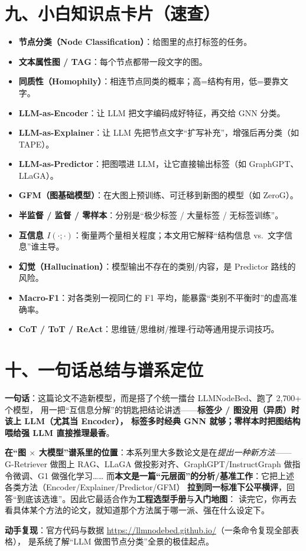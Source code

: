 \documentclass[11pt,UTF8,fontset=fandol]{ctexart}
\begin{document}
\section{九、小白知识点卡片（速查）}
\begin{itemize}[leftmargin=2em]
  \item \textbf{节点分类（Node Classification）}：给图里的点打标签的任务。
  \item \textbf{文本属性图 / TAG}：每个节点都带一段文字的图。
  \item \textbf{同质性（Homophily）}：相连节点同类的概率；高=结构有用，低=要靠文字。
  \item \textbf{LLM-as-Encoder}：让 LLM 把文字编码成好特征，再交给 GNN 分类。
  \item \textbf{LLM-as-Explainer}：让 LLM 先把节点文字“扩写补充”，增强后再分类（如 TAPE）。
  \item \textbf{LLM-as-Predictor}：把图喂进 LLM，让它直接输出标签（如 GraphGPT、LLaGA）。
  \item \textbf{GFM（图基础模型）}：在大图上预训练、可迁移到新图的模型（如 ZeroG）。
  \item \textbf{半监督 / 监督 / 零样本}：分别是“极少标签 / 大量标签 / 无标签训练”。
  \item \textbf{互信息 $I(\cdot;\cdot)$}：衡量两个量相关程度；本文用它解释“结构信息 vs.\ 文字信息”谁主导。
  \item \textbf{幻觉（Hallucination）}：模型输出不存在的类别/内容，是 Predictor 路线的风险。
  \item \textbf{Macro-F1}：对各类别一视同仁的 F1 平均，能暴露“类别不平衡时”的虚高准确率。
  \item \textbf{CoT / ToT / ReAct}：思维链/思维树/推理-行动等通用提示词技巧。
\end{itemize}

\section{十、一句话总结与谱系定位}

\textbf{一句话}：这篇论文不造新模型，而是搭了个统一擂台 LLMNodeBed、跑了 2{,}700+ 个模型，
用一把“互信息分解”的钥匙把结论讲透——\textbf{标签少 / 图没用（异质）时该上 LLM（尤其当 Encoder），
标签多时经典 GNN 就够；零样本时把图结构喂给强 LLM 直接推理最香}。

\textbf{在“图 $\times$ 大模型”谱系里的位置}：本系列里大多数论文是在\emph{提出一种新方法}——
G-Retriever 做图上 RAG、LLaGA 做投影对齐、GraphGPT/InstructGraph 做指令微调、G1 做强化学习……
而\textbf{本文是一篇“元层面”的分析/基准工作}：它把上述各类方法（Encoder/Explainer/Predictor/GFM）
\textbf{拉到同一标准下公平横评}，回答“到底该选谁”。因此它最适合作为\textbf{工程选型手册}与\textbf{入门地图}：
读完它，你再去看具体某个方法的论文，就知道那个方法属于哪一派、强在什么设定下。

\textbf{动手复现}：官方代码与数据 \url{https://llmnodebed.github.io/}（一条命令复现全部表格），
是系统了解“LLM 做图节点分类”全景的极佳起点。
\end{document}
